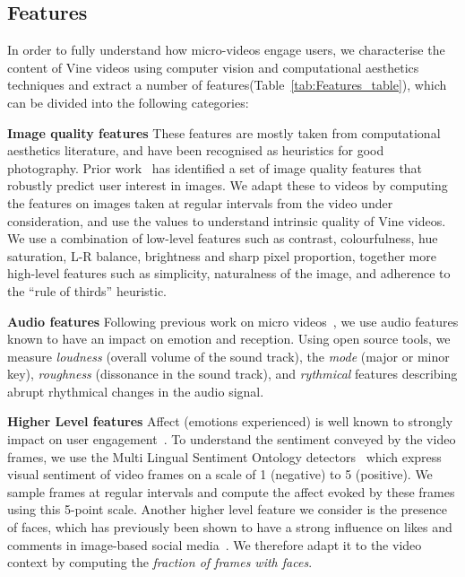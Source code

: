 \subsection{Features}
\label{sec:features}
In order to fully understand how micro-videos engage users, we characterise the content of Vine videos using computer vision and computational aesthetics techniques and  extract a number of features(Table~\ref{tab:Features_table}), which can be divided into the following categories: 

	\noindent\textbf{Image quality features} These features are mostly taken from computational aesthetics literature, and have been recognised as heuristics for good photography. Prior work~\cite{predictingPintrest} has identified a set of image quality features that robustly predict user interest in images. We  adapt these to videos by computing  the features on images taken at regular intervals from the video under consideration, and use the values to understand intrinsic quality of Vine videos. We use a combination of low-level features such as contrast, colourfulness, hue saturation, L-R balance, brightness and sharp pixel proportion, together more high-level features such as simplicity, naturalness of the image, and adherence to the  ``rule of thirds'' heuristic. 
	
	\noindent\textbf{Audio features}	
	Following previous work on micro videos~\cite{redi20146}, we use audio features known to have an impact on emotion and reception. Using open source tools\cite{lartillot2007matlab,laurier2009exploring}, we measure \emph{loudness} (overall volume of the sound track), the \emph{mode} (major or minor key), \emph{roughness} (dissonance in the sound track), and \emph{rythmical} features describing abrupt rhythmical changes in the audio signal. 
	
	\noindent\textbf{Higher Level features} Affect (emotions experienced) is well known to strongly impact on user engagement~\cite{o2008user,leung2009user}. To understand the sentiment conveyed by the video frames, we use the Multi Lingual Sentiment Ontology detectors~\cite{jou2015visual} which express visual sentiment of video frames on a scale of 1 (negative) to 5 (positive). We sample frames at regular intervals and compute the affect evoked by these frames using this 5-point scale. Another higher level feature we consider is the presence of faces, which has previously been shown to have a strong influence on  likes and comments in image-based social media~\cite{bakhshi2014faces}. We therefore adapt it to the video context by computing the \emph{fraction of frames with faces}. 
	
